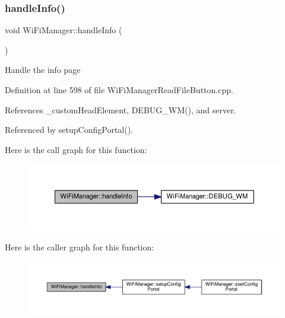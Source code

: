 \subsubsection{\texorpdfstring{handle\+Info()}{handleInfo()}}
{\footnotesize\ttfamily void Wi\+Fi\+Manager\+::handle\+Info (\begin{DoxyParamCaption}{ }\end{DoxyParamCaption})\hspace{0.3cm}{\ttfamily [private]}}

Handle the info page 

Definition at line 598 of file Wi\+Fi\+Manager\+Read\+File\+Button.\+cpp.



References \+\_\+custom\+Head\+Element, D\+E\+B\+U\+G\+\_\+\+W\+M(), and server.



Referenced by setup\+Config\+Portal().

Here is the call graph for this function\+:
\nopagebreak
\begin{figure}[H]
\begin{center}
\leavevmode
\includegraphics[width=350pt]{d4/dc8/class_wi_fi_manager_ac35e46661f8a209d84bba62d9aa43a35_cgraph}
\end{center}
\end{figure}
Here is the caller graph for this function\+:
\nopagebreak
\begin{figure}[H]
\begin{center}
\leavevmode
\includegraphics[width=350pt]{d4/dc8/class_wi_fi_manager_ac35e46661f8a209d84bba62d9aa43a35_icgraph}
\end{center}
\end{figure}
\mbox{\label{class_wi_fi_manager_a94fb1a8fcfbd0d02714c69138bf72f9c}} 
